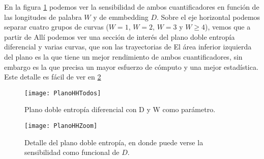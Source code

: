 En la figura \ref{fig:PlanoHHTodos} podemos ver la sensibilidad de ambos cuantificadores en función de las longitudes de palabra $W$ y de emmbedding $D$.
Sobre el eje horizontal podemos separar cuatro grupos de curvas ($W = 1$, $W = 2$, $W = 3$ y $W \geq 4$), vemos que a partir de 
Allí podemos ver una sección de interés del plano doble entropía diferencial y varias curvas, que son las trayectorias de 
El área inferior izquierda del plano es la que tiene un mejor rendimiento de ambos cuantificadores, sin embargo es la que precisa un mayor esfuerzo de cómputo y una mejor estadística.
Este detalle es fácil de ver en \ref{fig:PlanoHHZoom}
%
\begin{figure}
	\centering
	\texttt{[image: PlanoHHTodos]}
	\caption{Plano doble entropía diferencial con D y W como parámetro.}
	\label{fig:PlanoHHTodos}
\end{figure}
%
\begin{figure}
	\centering
	\texttt{[image: PlanoHHZoom]}
	\caption{Detalle del plano doble entropía, en donde puede verse la sensibilidad como funcional de $D$.}
	\label{fig:PlanoHHZoom}
\end{figure}
%